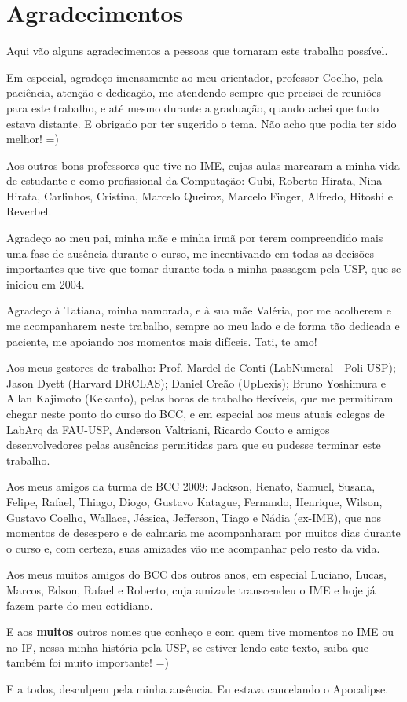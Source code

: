 
\newpage
\section*{Agradecimentos}

Aqui vão alguns agradecimentos a pessoas que tornaram este trabalho possível.

Em especial, agradeço imensamente ao meu orientador, professor Coelho, pela paciência,
atenção e dedicação, me atendendo sempre que precisei de reuniões para este trabalho, e
até mesmo durante a graduação, quando achei que tudo estava distante. E obrigado por
ter sugerido o tema. Não acho que podia ter sido melhor! =)

Aos outros bons professores que tive no IME, cujas aulas marcaram a minha vida de
estudante e como profissional da Computação: Gubi, Roberto Hirata, Nina Hirata,
Carlinhos, Cristina, Marcelo Queiroz, Marcelo Finger, Alfredo, Hitoshi e Reverbel.

Agradeço ao meu pai, minha mãe e minha irmã por terem compreendido mais uma fase de
ausência durante o curso, me incentivando em todas as decisões importantes que tive que
tomar durante toda a minha passagem pela USP, que se iniciou em 2004.

Agradeço à Tatiana, minha namorada, e à sua mãe Valéria, por me acolherem e me
acompanharem neste trabalho, sempre ao meu lado e de forma tão dedicada e paciente, me
apoiando nos momentos mais difíceis. Tati, te amo!

Aos meus gestores de trabalho: Prof. Mardel de Conti (LabNumeral - Poli-USP); Jason
Dyett (Harvard DRCLAS); Daniel Creão (UpLexis); Bruno Yoshimura e Allan Kajimoto
(Kekanto), pelas horas de trabalho flexíveis, que me permitiram chegar neste ponto do
curso do BCC, e em especial aos meus atuais colegas de LabArq da FAU-USP, Anderson
Valtriani, Ricardo Couto e amigos desenvolvedores pelas ausências permitidas para que
eu pudesse terminar este trabalho.

Aos meus amigos da turma de BCC 2009: Jackson, Renato, Samuel, Susana, Felipe, Rafael,
Thiago, Diogo, Gustavo Katague, Fernando, Henrique, Wilson, Gustavo Coelho, Wallace,
Jéssica, Jefferson, Tiago e Nádia (ex-IME), que nos momentos de desespero e de calmaria
me acompanharam por muitos dias durante o curso e, com certeza, suas amizades vão me
acompanhar pelo resto da vida.

Aos meus muitos amigos do BCC dos outros anos, em especial Luciano, Lucas, Marcos,
Edson, Rafael e Roberto, cuja amizade transcendeu o IME e hoje já fazem parte do meu
cotidiano.

E aos \textbf{muitos} outros nomes que conheço e com quem tive momentos no IME ou no
IF, nessa minha história pela USP, se estiver lendo este texto, saiba que também foi
muito importante! =)

E a todos, desculpem pela minha ausência. Eu estava cancelando o Apocalipse.

\afterpage{\clearpage}
